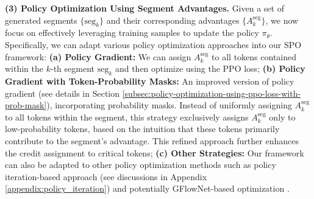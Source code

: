\textbf{(3) Policy Optimization Using Segment Advantages.}
Given a set of generated segments \(\{\text{seg}_k\}\) and their corresponding advantages \(\{A_k^{\mathrm{seg}}\}\), we now focus on effectively leveraging training samples to update the policy \(\pi_{\theta}\). Specifically, we can adapt various policy optimization approaches into our SPO framework: \textbf{(a) Policy Gradient:} We can assign \( A_k^{\mathrm{seg}} \) to all tokens contained within the $k$-th segment \(\text{seg}_k\) and then optimize using the PPO loss; \textbf{(b) Policy Gradient with Token-Probability Masks:} An improved version of policy gradient (see details in Section \ref{subsec:policy-optimization-using-ppo-loss-with-prob-mask}), incorporating probability masks. Instead of uniformly assigning \( A_k^{\mathrm{seg}} \) to all tokens within the segment, this strategy exclusively assigns \( A_k^{\mathrm{seg}}\) only to low-probability tokens, based on the intuition that these tokens primarily contribute to the segment's advantage. This refined approach further enhances the credit assignment to critical tokens; \textbf{(c) Other Strategies:} Our framework can also be adapted to other policy optimization methods such as policy iteration-based approach (see discussions in Appendix \ref{appendix:policy_iteration}) and potentially GFlowNet-based optimization \cite{bartoldson2025trajectorybalanceasynchronydecoupling}.